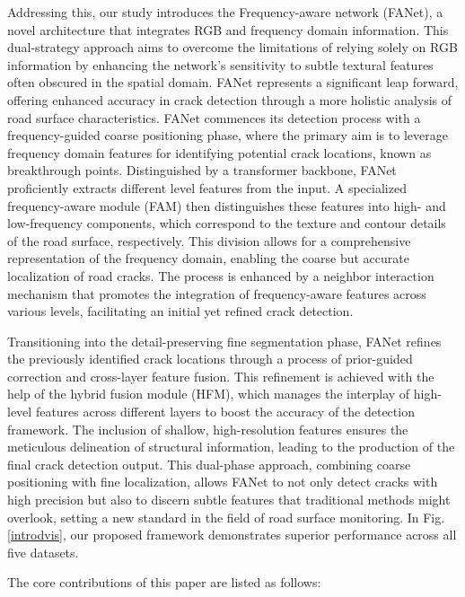 \documentclass[journal]{IEEEtran}
\begin{document}

Addressing this, our study introduces the Frequency-aware network (FANet), a novel architecture that integrates RGB and frequency domain information. This dual-strategy approach aims to overcome the limitations of relying solely on RGB information by enhancing the network's sensitivity to subtle textural features often obscured in the spatial domain. FANet represents a significant leap forward, offering enhanced accuracy in crack detection through a more holistic analysis of road surface characteristics.
FANet commences its detection process with a frequency-guided coarse positioning phase, where the primary aim is to leverage frequency domain features for identifying potential crack locations, known as breakthrough points. Distinguished by a transformer backbone, FANet proficiently extracts different level features from the input. A specialized frequency-aware module (FAM) then distinguishes these features into high- and low-frequency components, which correspond to the texture and contour details of the road surface, respectively. This division allows for a comprehensive representation of the frequency domain, enabling the coarse but accurate localization of road cracks. The process is enhanced by a neighbor interaction mechanism that promotes the integration of frequency-aware features across various levels, facilitating an initial yet refined crack detection.

Transitioning into the detail-preserving fine segmentation phase, FANet refines the previously identified crack locations through a process of prior-guided correction and cross-layer feature fusion. This refinement is achieved with the help of the hybrid fusion module (HFM), which manages the interplay of high-level features across different layers to boost the accuracy of the detection framework. The inclusion of shallow, high-resolution features ensures the meticulous delineation of structural information, leading to the production of the final crack detection output. This dual-phase approach, combining coarse positioning with fine localization, allows FANet to not only detect cracks with high precision but also to discern subtle features that traditional methods might overlook, setting a new standard in the field of road surface monitoring. In Fig. \ref{introdvis}, our proposed framework demonstrates superior performance across all five datasets. 

The core contributions of this paper are listed as follows:
\end{document}
